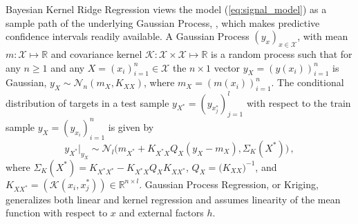 \documentclass[10pt, conference, compsocconf]{IEEEtran}
\newcommand{\Ncal}{\mathcal{N}}
\newcommand{\Kcal}{\mathcal{K}}
\newcommand{\Xcal}{\mathcal{X}}
\newcommand{\Real}{\mathbb{R}}
\begin{document}
Bayesian Kernel Ridge Regression views the model (\ref{eq:signal_model}) as a sample
path of the underlying Gaussian Process, \cite{rasmussen2006}, which makes predictive
confidence intervals readily available. A Gaussian Process $(y_x)_{x\in \Xcal}$, with
mean $m : \Xcal \mapsto \Real$ and covariance kernel  $\Kcal : \Xcal \times \Xcal \mapsto \Real$
is a random process such that for any $n\geq1$ and any $X = (x_i)_{i=1}^n \in \Xcal$
the $n\times 1$ vector $y_X = (y(x_i))_{i=1}^n$ is Gaussian, $y_X \sim \Ncal_n(m_X, K_{XX})$,
where $m_X = (m(x_i))_{i=1}^n$. The conditional distribution of targets in a test sample
$y_{X^*} = (y_{x^*_j})_{j=1}^l$ with respect to the train sample $y_X = (y_{x_i})_{i=1}^n$
is given by
\begin{equation} \label{eq:cond_distr}
  y_{X^*}\vert_{y_X}
    \sim \Ncal_l\bigl(
      m_{X^*} + K_{X^*X} Q_X (y_X - m_X),
      \Sigma_K(X^*)
    \bigr)
    \,,
\end{equation}
where $\Sigma_K(X^*) = K_{X^*X^*} - K_{X^*X} Q_X K_{XX^*}$, $Q_X = \bigl(K_{XX}\bigr)^{-1}$,
and $K_{XX^*} = (\Kcal(x_i, x^*_j))\in \Real^{n\times l}$. Gaussian Process Regression,
or Kriging, generalizes both linear and kernel regression and assumes linearity of the
mean function with respect to $x$ and external factors $h$.
\end{document}

